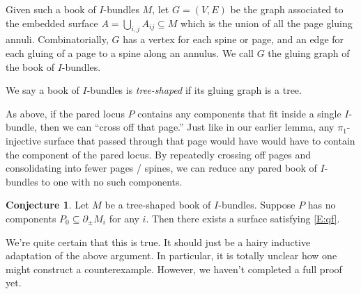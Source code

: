 \documentclass[12pt]{amsart}
\theoremstyle{definition}
\newtheorem{conj}[theorem]{Conjecture}
\theoremstyle{remark}
\newcommand{\bd}{\partial}
\newcommand{\cin}{\subseteq}
\begin{document}
Given such a book of $I$-bundles $M$, let $G=(V,E)$ be the graph associated to
the embedded surface $A = \bigcup_{i,j} A_{ij} \cin M$ which is the union of
all the page gluing annuli. Combinatorially, $G$ has a vertex for each spine or
page, and an edge for each gluing of a page to a spine along an annulus. We
call $G$ the gluing graph of the book of $I$-bundles.

We say a book of $I$-bundles is \emph{tree-shaped} if its gluing graph is
a tree.

As above, if the pared locus $P$ contains any components that fit inside
a single $I$-bundle, then we can ``cross off that page.'' Just like in our
earlier lemma, any $\pi_1$-injective surface that passed through that page
would have would have to contain the component of the pared locus. By
repeatedly crossing off pages and consolidating into fewer pages / spines, we
can reduce any pared book of $I$-bundles to one with no such components.

\begin{conj}

Let $M$ be a tree-shaped book of $I$-bundles. Suppose $P$ has no components
$P_0\cin \bd_\pm M_i$ for any $i$. Then there exists a surface satisfying
\eqref{E:qf}.

\end{conj}

We're quite certain that this is true. It should just be a hairy inductive
adaptation of the above argument. In particular, it is totally unclear how one
might construct a counterexample. However, we haven't completed a full proof
yet.
\end{document}
